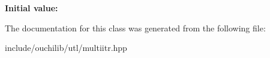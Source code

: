 {\bfseries Initial value\+:}
\begin{DoxyCode}{0}
\DoxyCodeLine{        >}

\end{DoxyCode}


The documentation for this class was generated from the following file\+:\begin{DoxyCompactItemize}
\item 
include/ouchilib/utl/multiitr.\+hpp\end{DoxyCompactItemize}
